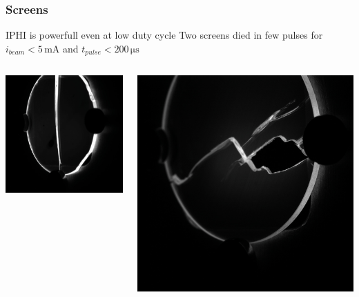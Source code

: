 \begin{frame}[t]
  \frametitle{Screens}
  \begin{block}{IPHI is powerfull even at low duty cycle}
    Two screens died in few pulses for $i_{beam} < 5 \, \mathrm{mA}$ and $t_{pulse} < 200 \, \mathrm{\mu s}$
  \end{block}
  \begin{columns}[T]
    \begin{column}{0.45\textwidth}
      \includegraphics[width=1\textwidth]{06_Backup/fig/fig000_rip_a}
    \end{column}
    \begin{column}{0.45\textwidth}
      \includegraphics[width=1\textwidth]{06_Backup/fig/fig000_rip_b}
    \end{column}
  \end{columns}
\end{frame}

